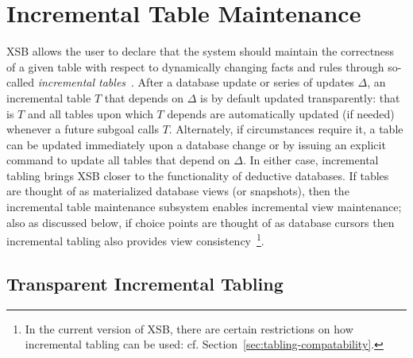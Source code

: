 \section{Incremental Table Maintenance} \label{sec:incremental_tabling}


XSB allows the user to declare that the system should maintain the
correctness of a given table with respect to dynamically changing
facts and rules through so-called {\em incremental
  tables}~\cite{SaRa05,Saha06,Swif14}.
After a database update or series of updates $\Delta$, an incremental
table $T$ that depends on $\Delta$ is by default updated
transparently: that is $T$ and all tables upon which $T$ depends are
automatically updated (if needed) whenever a future subgoal calls $T$.
Alternately, if circumstances require it, a table can be updated
immediately upon a database change or by issuing an explicit command
to update all tables that depend on $\Delta$.
%
In either case, incremental tabling brings XSB closer to the
functionality of deductive databases.  If tables are thought of as
materialized database views (or snapshots), then the incremental table
maintenance subsystem enables incremental view maintenance; also as
discussed below, if choice points are thought of as database cursors
then incremental tabling also provides view consistency~\footnote{In
  the current version of XSB, there are certain restrictions on how
  incremental tabling can be used:
  cf. Section~\ref{sec:tabling-compatability}.}.

\subsection{Transparent Incremental Tabling} \label{sec:incr_examples}

